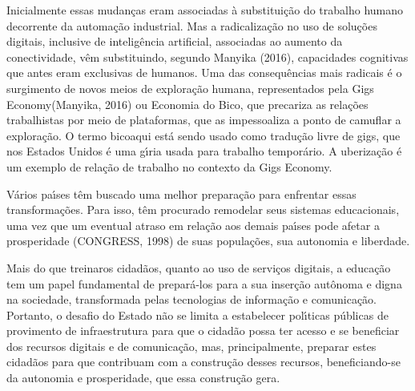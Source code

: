 \documentclass[
12pt,		%
openright,	%
twoside,  %
a4paper,			%
chapter=TITLE,		%
english,			%
french,				%
spanish,			%
brazil				%
]{USPSC-classe/USPSC}
\begin{document}
Inicialmente essas mudan\c{c}as eram associadas \`a substitui\c{c}\~ao do trabalho humano decorrente da automa\c{c}\~ao industrial. Mas a radicaliza\c{c}\~ao no uso de solu\c{c}\~oes digitais, inclusive de intelig\^encia artificial, associadas ao aumento da conectividade, v\^em substituindo, segundo  Manyika (2016), \textquotedbl capacidades cognitivas que antes eram exclusivas de humanos\textquotedbl . Uma das consequ\^encias mais radicais \'e o surgimento de novos meios de explora\c{c}\~ao humana, representados pela \textquotedbl Gigs Economy\textquotedbl   (Manyika, 2016) ou \textquotedbl Economia do Bico\textquotedbl , que precariza as rela\c{c}\~oes trabalhistas por meio de plataformas, que as impessoaliza a ponto de camuflar a explora\c{c}\~ao. O termo \textquotedbl bico\textquotedbl  aqui est\'a sendo usado como tradu\c{c}\~ao livre de \textquotedbl gigs\textquotedbl , que nos Estados Unidos \'e uma g\'{\i}ria usada para trabalho tempor\'ario. A uberiza\c{c}\~ao \'e um exemplo de rela\c{c}\~ao de trabalho no contexto da Gigs Economy.

















V\'arios pa\'{\i}ses t\^em buscado uma melhor prepara\c{c}\~ao para enfrentar essas transforma\c{c}\~oes. Para isso, t\^em procurado remodelar seus sistemas educacionais, uma vez que um eventual atraso em rela\c{c}\~ao aos demais pa\'{\i}ses pode afetar a prosperidade (CONGRESS, 1998)  de suas popula\c{c}\~oes, sua autonomia e liberdade.

















Mais do que \textquotedbl treinar\textquotedbl  os cidad\~aos, quanto ao uso  de servi\c{c}os digitais, a educa\c{c}\~ao tem um papel fundamental de prepar\'a-los para a sua inser\c{c}\~ao aut\^onoma e digna na sociedade, transformada pelas tecnologias de informa\c{c}\~ao e comunica\c{c}\~ao. Portanto, o desafio do Estado n\~ao se limita a estabelecer pol\'{\i}ticas p\'ublicas de provimento de infraestrutura para que o cidad\~ao possa ter acesso e se beneficiar dos recursos digitais e de comunica\c{c}\~ao, mas, principalmente, preparar estes cidad\~aos para que contribuam com a  constru\c{c}\~ao desses recursos, beneficiando-se da autonomia e prosperidade, que  essa constru\c{c}\~ao gera.
\end{document}
